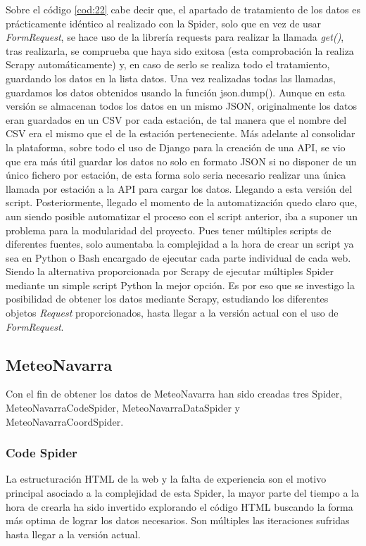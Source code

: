 Sobre el código \ref{cod:22} cabe decir que, el apartado de tratamiento de los datos es prácticamente idéntico al realizado con la Spider, solo que en vez de usar \textit{FormRequest}, se hace uso de la librería requests para realizar la llamada \textit{get()}, tras realizarla, se comprueba que haya sido exitosa (esta comprobación la realiza Scrapy automáticamente) y, en caso de serlo se realiza todo el tratamiento, guardando los datos en la lista datos. Una vez realizadas todas las llamadas, guardamos los datos obtenidos usando la función json.dump().\newline
\newline
Aunque en esta versión se almacenan todos los datos en un mismo JSON, originalmente los datos eran guardados en un CSV por cada estación, de tal manera que el nombre del CSV era el mismo que el de la estación perteneciente. Más adelante al consolidar la plataforma, sobre todo el uso de Django para la creación de una API, se vio que era más útil guardar los datos no solo en formato JSON si no disponer de un único fichero por estación, de esta forma solo seria necesario realizar una única llamada por estación a la API para cargar los datos. Llegando a esta versión del script.\newline
\newline
Posteriormente, llegado el momento de la automatización quedo claro que, aun siendo posible automatizar el proceso con el script anterior, iba a suponer un problema para la modularidad del proyecto. Pues tener múltiples scripts de diferentes fuentes, solo aumentaba la complejidad a la hora de crear un script ya sea en Python o Bash encargado de ejecutar cada parte individual de cada web. Siendo la alternativa proporcionada por Scrapy de ejecutar múltiples Spider mediante un simple script Python la mejor opción.\newline
\newline
Es por eso que se investigo la posibilidad de obtener los datos mediante Scrapy, estudiando los diferentes objetos \textit{Request} proporcionados, hasta llegar a la versión actual con el uso de \textit{FormRequest}.

\subsection{MeteoNavarra}
Con el fin de obtener los datos de MeteoNavarra han sido creadas tres Spider, MeteoNavarraCodeSpider, MeteoNavarraDataSpider y MeteoNavarraCoordSpider.

\subsubsection{Code Spider}
La estructuración HTML de la web y la falta de experiencia son el motivo principal asociado a la complejidad de esta Spider, la mayor parte del tiempo a la hora de crearla ha sido invertido explorando el código HTML buscando la forma más optima de lograr los datos necesarios. Son múltiples las iteraciones sufridas hasta llegar a la versión actual.

